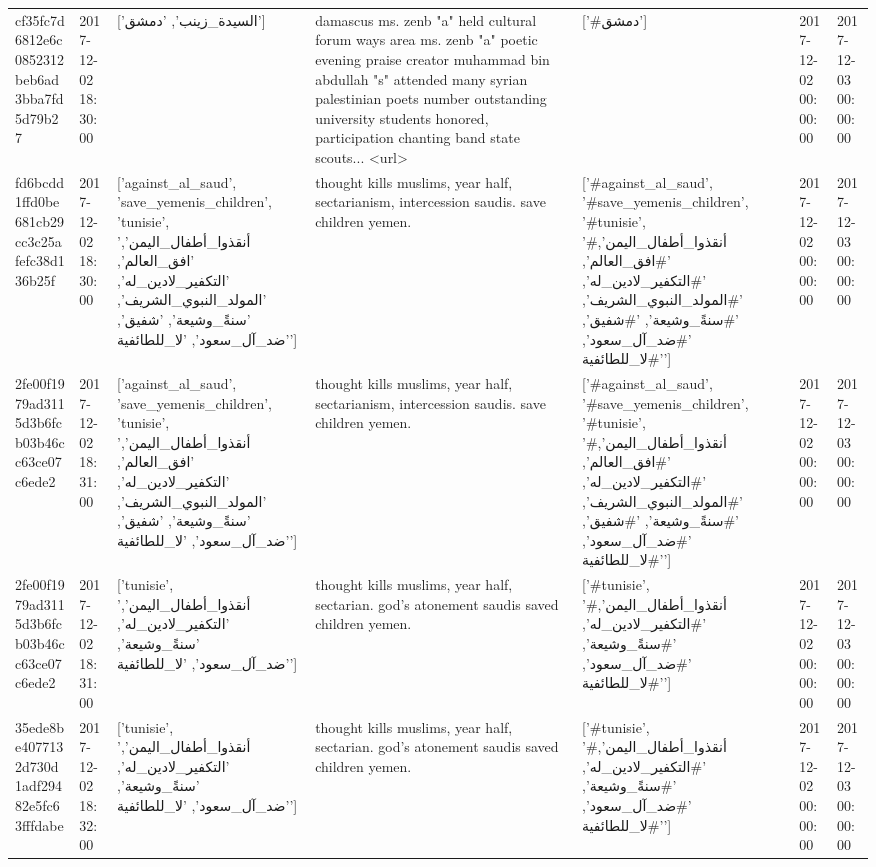 \begin{tabular}{lllllll}
cf35fc7d6812e6c0852312beb6ad3bba7fd5d79b27 & 2017-12-02 18:30:00 & ['السيدة_زينب', 'دمشق'] & damascus ms. zenb "a" held cultural forum ways area ms. zenb "a" poetic evening praise creator muhammad bin abdullah "s" attended many syrian palestinian poets number outstanding university students honored, participation chanting band state scouts... <url> & ['#دمشق'] & 2017-12-02 00:00:00 & 2017-12-03 00:00:00 \\
fd6bcdd1ffd0be681cb29cc3c25afefc38d136b25f & 2017-12-02 18:30:00 & ['against_al_saud', 'save_yemenis_children', 'tunisie', 'أنقذوا_أطفال_اليمن', 'افق_العالم', 'التكفير_لادين_له', 'المولد_النبوي_الشريف', 'سنةً_وشيعة', 'شفيق', 'ضد_آل_سعود', 'لا_للطائفية'] & thought kills muslims, year half, sectarianism, intercession saudis. save children yemen. & ['#against_al_saud', '#save_yemenis_children', '#tunisie', '#أنقذوا_أطفال_اليمن', '#افق_العالم', '#التكفير_لادين_له', '#المولد_النبوي_الشريف', '#سنةً_وشيعة', '#شفيق', '#ضد_آل_سعود', '#لا_للطائفية'] & 2017-12-02 00:00:00 & 2017-12-03 00:00:00 \\
2fe00f1979ad3115d3b6fcb03b46cc63ce07c6ede2 & 2017-12-02 18:31:00 & ['against_al_saud', 'save_yemenis_children', 'tunisie', 'أنقذوا_أطفال_اليمن', 'افق_العالم', 'التكفير_لادين_له', 'المولد_النبوي_الشريف', 'سنةً_وشيعة', 'شفيق', 'ضد_آل_سعود', 'لا_للطائفية'] & thought kills muslims, year half, sectarianism, intercession saudis. save children yemen. & ['#against_al_saud', '#save_yemenis_children', '#tunisie', '#أنقذوا_أطفال_اليمن', '#افق_العالم', '#التكفير_لادين_له', '#المولد_النبوي_الشريف', '#سنةً_وشيعة', '#شفيق', '#ضد_آل_سعود', '#لا_للطائفية'] & 2017-12-02 00:00:00 & 2017-12-03 00:00:00 \\
2fe00f1979ad3115d3b6fcb03b46cc63ce07c6ede2 & 2017-12-02 18:31:00 & ['tunisie', 'أنقذوا_أطفال_اليمن', 'التكفير_لادين_له', 'سنةً_وشيعة', 'ضد_آل_سعود', 'لا_للطائفية'] & thought kills muslims, year half, sectarian. god's atonement saudis saved children yemen. & ['#tunisie', '#أنقذوا_أطفال_اليمن', '#التكفير_لادين_له', '#سنةً_وشيعة', '#ضد_آل_سعود', '#لا_للطائفية'] & 2017-12-02 00:00:00 & 2017-12-03 00:00:00 \\
35ede8be4077132d730d1adf29482e5fc63fffdabe & 2017-12-02 18:32:00 & ['tunisie', 'أنقذوا_أطفال_اليمن', 'التكفير_لادين_له', 'سنةً_وشيعة', 'ضد_آل_سعود', 'لا_للطائفية'] & thought kills muslims, year half, sectarian. god's atonement saudis saved children yemen. & ['#tunisie', '#أنقذوا_أطفال_اليمن', '#التكفير_لادين_له', '#سنةً_وشيعة', '#ضد_آل_سعود', '#لا_للطائفية'] & 2017-12-02 00:00:00 & 2017-12-03 00:00:00 \\

\end{tabular}
